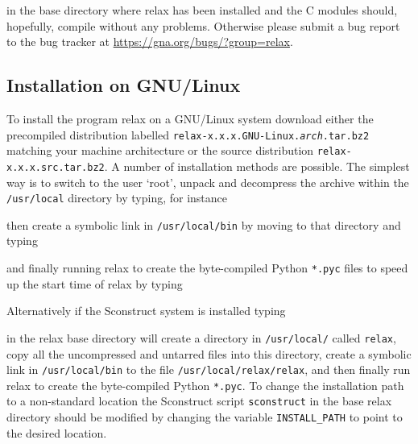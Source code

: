 
in the base directory where relax has been installed and the C modules should, hopefully, compile without any problems.  Otherwise please submit a bug report to the bug tracker at \href{https://gna.org/bugs/?group=relax}{https://gna.org/bugs/?group=relax}.



\subsection{Installation on GNU/Linux}

To install the program relax on a GNU/Linux system download either the precompiled distribution labelled \texttt{relax-x.x.x.GNU-Linux.\textit{arch}.tar.bz2} matching your machine architecture or the source distribution \texttt{relax-x.x.x.src.tar.bz2}.  A number of installation methods are possible.  The simplest way is to switch to the user `root', unpack and decompress the archive within the \texttt{/usr/local} directory by typing, for instance


then create a symbolic link in \texttt{/usr/local/bin} by moving to that directory and typing


and finally running relax to create the byte-compiled Python \texttt{*.pyc} files to speed up the start time of relax by typing


Alternatively if the Sconstruct system is installed typing


in the relax base directory will create a directory in \texttt{/usr/local/} called \texttt{relax}, copy all the uncompressed and untarred files into this directory, create a symbolic link in \texttt{/usr/local/bin} to the file \texttt{/usr/local/relax/relax}, and then finally run relax to create the byte-compiled Python \texttt{*.pyc}.  To change the installation path to a non-standard location the Sconstruct script \texttt{sconstruct} in the base relax directory should be modified by changing the variable \texttt{INSTALL\_PATH} to point to the desired location.



